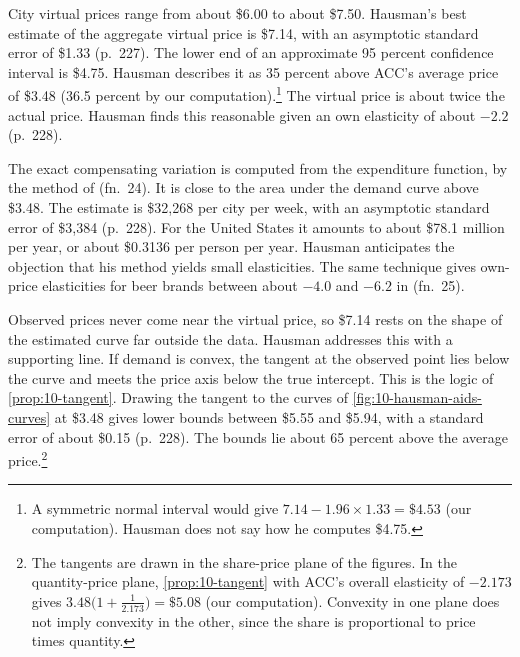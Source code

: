 City virtual prices range from about \$6.00 to about \$7.50. Hausman's best estimate of the aggregate
virtual price is \$7.14, with an asymptotic standard error of \$1.33 (p.~227). The lower end of an
approximate 95 percent confidence interval is \$4.75. Hausman describes it as 35 percent above ACC's average
price of \$3.48 (36.5 percent by our computation).\footnote{A symmetric normal interval would give
$7.14 - 1.96\times 1.33 = \$4.53$ (our computation). Hausman does not say how he computes \$4.75.} The virtual price is about twice the actual price. Hausman finds this reasonable given an own
elasticity of about $-2.2$ (p.~228).

The exact compensating variation is computed from the expenditure function, by the method of
\citet{HausmanNewey1995} (fn.~24). It is close to the area under the demand curve above \$3.48. The estimate
is \$32,268 per city per week, with an asymptotic standard error of \$3,384 (p.~228). For the United States
it amounts to about \$78.1 million per year, or about \$0.3136 per person per year. Hausman anticipates the
objection that his method yields small elasticities. The same technique gives own-price elasticities for
beer brands between about $-4.0$ and $-6.2$ in \citet{HausmanLeonardZona1994} (fn.~25).

Observed prices never come near the virtual price, so \$7.14 rests on the shape of the estimated curve far
outside the data. Hausman addresses this with a supporting line. If demand is convex, the tangent at the
observed point lies below the curve and meets the price axis below the true intercept. This is the logic of
\cref{prop:10-tangent}. Drawing the tangent to the curves of \cref{fig:10-hausman-aids-curves} at \$3.48
gives lower bounds between \$5.55 and \$5.94, with a standard error of about \$0.15 (p.~228). The bounds lie
about 65 percent above the average price.\footnote{The tangents are drawn in the share-price plane of the
figures. In the quantity-price plane, \cref{prop:10-tangent} with ACC's overall elasticity of $-2.173$ gives
$3.48\bigl(1 + \frac{1}{2.173}\bigr) = \$5.08$ (our computation). Convexity in one plane does not imply
convexity in the other, since the share is proportional to price times quantity.}

